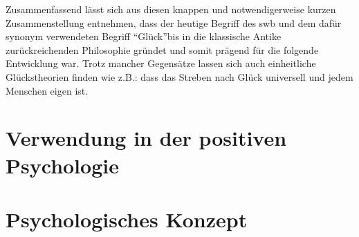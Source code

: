 Zusammenfassend lässt sich aus diesen knappen und notwendigerweise kurzen Zusammenstellung entnehmen, dass der heutige Begriff des \gls{swb} und dem dafür synonym verwendeten Begriff \textquotedblleft Glück\textquotedblright  bis in die klassische Antike zurückreichenden Philosophie gründet und somit prägend für die folgende Entwicklung war. Trotz mancher Gegensätze lassen sich auch einheitliche Glückstheorien finden wie z.B.: dass das Streben nach Glück universell und jedem Menschen eigen ist.   
 

\section{Verwendung in der positiven Psychologie}\label{positivePsychologie}

\section{Psychologisches Konzept}\label{konzept}


